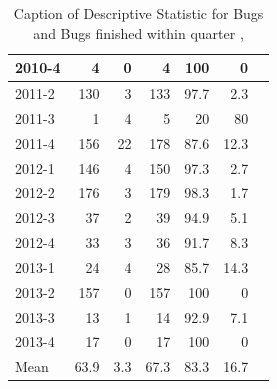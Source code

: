\documentclass[UKenglish]{ifimaster}  %
\begin{document}
\begin{table}[!htbp]
\begin{adjustwidth}{-2.5cm}{}
{{\begin{tabular}{ | l | r | r | r | r | r | r | }
2010-4 & 4 & 0 & 4 & 100 & 0 \\ \hline
2011-2 & 130 & 3 & 133 & 97.7 & 2.3 \\ \hline
2011-3 & 1 & 4 & 5 & 20 & 80 \\ \hline
2011-4 & 156 & 22 & 178 & 87.6 & 12.3 \\ \hline
2012-1 & 146 & 4 & 150 & 97.3 & 2.7 \\ \hline
2012-2 & 176 & 3 & 179 & 98.3& 1.7 \\ \hline
2012-3 & 37 & 2 & 39 & 94.9& 5.1\\ \hline
2012-4 & 33 & 3 & 36 & 91.7 & 8.3 \\ \hline
2013-1 & 24 & 4 & 28 & 85.7 & 14.3 \\ \hline
2013-2 & 157 & 0 & 157 & 100 & 0 \\ \hline
2013-3 & 13 & 1 & 14 & 92.9& 7.1 \\ \hline
2013-4 & 17 & 0 & 17 & 100 & 0 \\ \hline
Mean & 63.9&3.3&67.3&83.3&16.7\\ \hline

\end{tabular}
}
}
\end{adjustwidth}
\caption[Optional caption for list of figures]{Caption of Descriptive Statistic for Bugs and Bugs finished within quarter  , }
\label{DS:1:5} %
\end{table}
 
 
 
\end{document}
